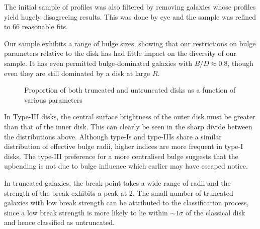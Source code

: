 The initial sample of profiles was also filtered by removing galaxies whose profiles yield hugely disagreeing results. This was done by eye and the sample was refined to 66 reasonable fits. 

Our sample exhibits a range of bulge sizes, showing that our restrictions on bulge parameters relative to the disk has had little impact on the diversity of our sample. It has even permitted bulge-dominated galaxies with $B/D \approx 0.8$, though even they are still dominated by a disk at large $R$.

\begin{figure}
	\caption{Proportion of both truncated and untruncated disks as a function of various parameters}
	\label{fig: prop_hist}
\end{figure}


In Type-III disks, the central surface brightness of the outer disk must be greater than that of the inner disk. This can clearly be seen in the sharp divide between the distributions above. Although type-Is and type-IIIs share a similar distribution of effective bulge radii, higher \sersic indices are more frequent in type-I disks. The type-III preference for a more centralised bulge suggests that the upbending is not due to bulge influence which earlier may have escaped notice. 

In truncated galaxies, the break point takes a wide range of radii and the strength of the break exhibits a peak at 2. The small number of truncated galaxies with low break strength can be attributed to the classification process, since a low break strength is more likely to lie within $\sim 1\sigma$ of the classical disk and hence classified as untruncated. 



